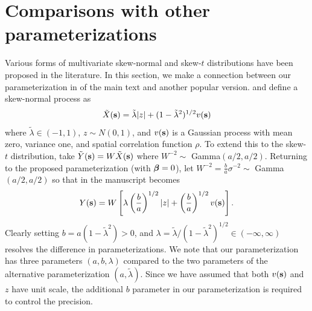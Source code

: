 \documentclass[useAMS,usenatbib,referee]{biomweb}
\begin{document}
\section{Comparisons with other parameterizations} \label{sta:otherparams}
Various forms of multivariate skew-normal and skew-$t$ distributions have been proposed in the literature.
In this section, we make a connection between our parameterization in  of the main text and another popular version.
\citet{Azzalini2014} and \citet{Beranger2016} define a skew-normal process as
\begin{align}
  \tilde{X}(\mbox{\bf s}) = \tilde{\lambda}|z| + (1 - \tilde{\lambda}^2)^{1 / 2} v(\mbox{\bf s})
\end{align}
where $\tilde{\lambda} \in (-1, 1)$, $z \sim N(0, 1)$, and $v(\mbox{\bf s})$ is a Gaussian process with mean zero, variance one, and spatial correlation function $\rho$.
To extend this to the skew-$t$ distribution, \citet{Azzalini2003} take $\tilde{Y}(\mbox{\bf s}) = W\tilde{X}(\mbox{\bf s})$ where $W^{-2} \sim $ Gamma$(a / 2, a / 2)$.
Returning to the proposed parameterization (with $\mbox{\boldmath $\beta$} = 0$), let $W^{-2} = \frac{b}{a}\sigma^{-2} \sim$ Gamma$(a / 2, a / 2)$ so that  in the manuscript becomes
\begin{align}
  Y(\mbox{\bf s}) = W \left[ \lambda \left(\frac{b}{a}\right)^{1 / 2} |z| + \left(\frac{b}{a}\right)^{1 / 2} v(\mbox{\bf s}) \right].
\end{align}
Clearly setting $b = a (1 - \tilde{\lambda}^2) > 0$, and $\lambda = \tilde{\lambda} / (1 - \tilde{\lambda}^2)^{1 / 2} \in (-\infty, \infty)$ resolves the difference in parameterizations.
We note that our parameterization has three parameters $(a, b, \lambda)$ compared to the two parameters of the alternative parameterization $(a, \tilde{\lambda})$.
Since we have assumed that both $v(\mbox{\bf s})$ and $z$ have unit scale, the additional $b$ parameter in our parameterization is required to control the precision.
\end{document}
